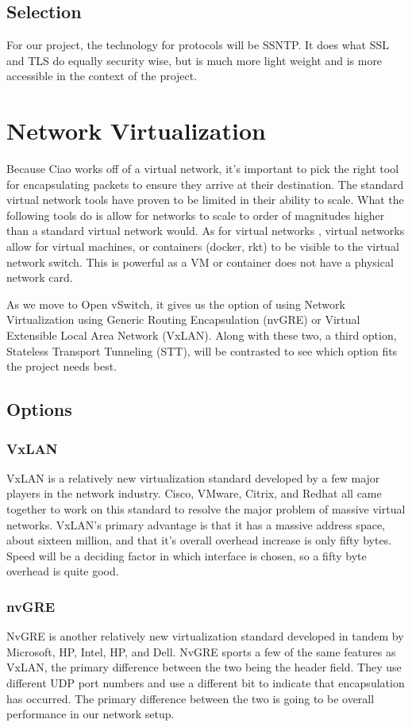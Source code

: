 \documentclass[10pt,letterpaper,onecolumn,draftclsnofoot]{IEEEtran}
\begin{document}
\subsection{Selection}
For our project, the technology for protocols will be SSNTP. It does what SSL
and TLS do equally security wise, but is much more light weight and is more
accessible in the context of the project.


\section{Network Virtualization}
Because Ciao works off of a virtual network, it's important to pick the right
tool for encapsulating packets to ensure they arrive at their destination. The
standard virtual network tools have proven to be limited in their ability to
scale. What the following tools do is allow for networks to scale to order of
magnitudes higher than a standard virtual network would. As for virtual networks
, virtual networks allow for virtual machines, or containers (docker, rkt) to be
visible to the virtual network switch. This is powerful as a VM or container
does not have a physical network card.

As we move to Open vSwitch, it gives us the option of using Network
Virtualization using Generic Routing Encapsulation (nvGRE) or Virtual Extensible
Local Area Network (VxLAN). Along with these two, a third option, Stateless
Transport Tunneling (STT), will be contrasted to see which option fits the
project needs best.

\subsection{Options}
\subsubsection{VxLAN}
VxLAN is a relatively new virtualization standard developed by a few major
players in the network industry. Cisco, VMware, Citrix, and Redhat all came
together to work on this standard to resolve the major problem of massive
virtual networks. VxLAN's primary advantage is that it has a massive address
space, about sixteen million, and that it's overall overhead increase is only
fifty bytes. \cite{vxlan} Speed will be a deciding factor in which interface
is chosen, so a fifty byte overhead is quite good.

\subsubsection{nvGRE}
NvGRE is another relatively new virtualization standard developed in tandem by
Microsoft, HP, Intel, HP, and Dell.\cite{nvgre-info} NvGRE sports a few of the
same features as VxLAN, the primary difference between the two being the header
field. They use different UDP port numbers and use a different bit to indicate
that encapsulation has occurred.\cite{nvgre} The primary difference between the
two is going to be overall performance in our network setup.
\end{document}

